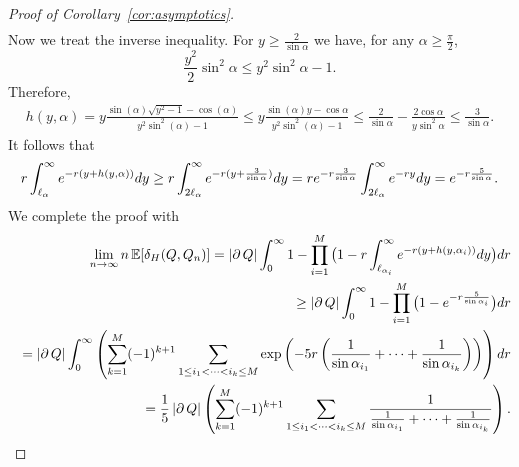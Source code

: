 \documentclass[10pt,a4paper]{amsart}
\newcommand{\IE}{\mathbb{E}}
\newcommand{\dd}{{\rm d}}
\begin{document}
\begin{proof}[Proof of Corollary~\ref{cor:asymptotics}]
\begin{eqnarray*}
\end{eqnarray*}
Now we treat the inverse inequality. For $y\geq\frac{2}{\sin\alpha}$ we have, for any $\alpha\ge \frac{\pi}{2}$,
$$
\frac{y^2}{2}\sin^{2}\alpha \leq y^2 \sin^{2}\alpha  -1.
$$
Therefore,
\begin{eqnarray*}
h(y,\alpha)
= y\frac{\sin(\alpha)\sqrt{y^2-1}-\cos(\alpha)}{y^2 \sin^2(\alpha)-1}
\leq y\frac{\sin(\alpha)y-\cos\alpha}{y^2 \sin^2(\alpha)-1}
\leq\frac{2}{\sin\alpha}-\frac{2\cos\alpha}{y\sin^{2}\alpha}
\leq\frac{3}{\sin\alpha}.
\end{eqnarray*}
It follows that
\[
r\int_{\ell_{\alpha}}^{\infty}e^{-r(y+h(y,\alpha))}\dd y
\geq r\int_{2\ell_{\alpha}}^{\infty}e^{-r(y+\frac{3}{\sin\alpha})}\dd y
=re^{-r\frac{3}{\sin\alpha}}\int_{2\ell_{\alpha}}^{\infty}e^{-ry}\dd y
=e^{-r\frac{5}{\sin\alpha}}.
\]
We complete the proof with 
\begin{eqnarray*}
&&\lim_{n\to\infty}n \, \IE[\delta_H(Q,Q_n)]
= \left| \partial \, Q \right| \int_{0}^{\infty}1-\prod_{i=1}^M\big(1-r\int_{\ell_{\alpha_i}}^{\infty}e^{-r(y+h(y,\alpha_i))}\dd y\big)\dd r
\\
&&\geq\left| \partial \, Q \right| \int_{0}^{\infty}1-\prod_{i=1}^M
\big(1-e^{-r\frac{5}{\sin\alpha_{i}}}\big)\dd r
\\
&&=\left| \partial \, Q \right| \int_{0}^{\infty}\left(\sum_{k=1}^{M}(-1)^{k+1}\sum_{1\leq i_{1}<\cdots<i_{k}\leq M}
\exp\left(-5r\left(\frac{1}{\sin\alpha_{i_{1}}}+\cdots+\frac{1}{\sin\alpha_{i_{k}}}\right)\right)
\right)\dd r
\\
&&=\frac{1}{5}\left| \partial \, Q \right| \left(\sum_{k=1}^{M}(-1)^{k+1}\sum_{1\leq i_{1}<\cdots<i_{k}\leq M}
\frac{1}{\frac{1}{\sin\alpha_{i_{1}}}+\cdots+\frac{1}{\sin\alpha_{i_{k}}}}
\right).
\end{eqnarray*}
\end{proof}
\end{document}
